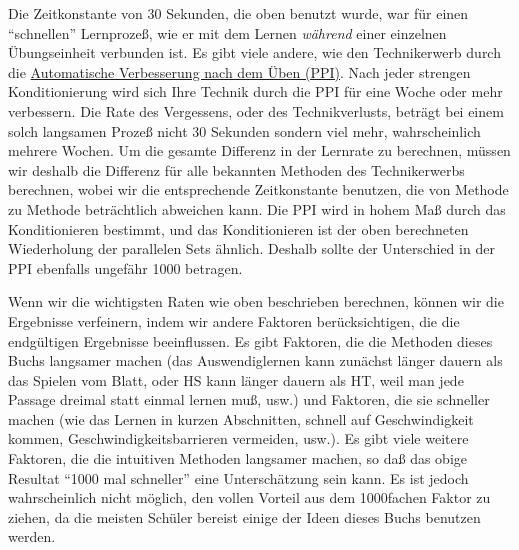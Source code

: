Die Zeitkonstante von 30 Sekunden, die oben benutzt wurde, war für einen \enquote{schnellen} Lernprozeß, wie er mit dem Lernen \textit{während} einer einzelnen Übungseinheit verbunden ist.
Es gibt viele andere, wie den Technikerwerb durch die \hyperref[c1ii15]{Automatische Verbesserung nach dem Üben (PPI)}.
Nach jeder strengen Konditionierung wird sich Ihre Technik durch die PPI für eine Woche oder mehr verbessern.
Die Rate des Vergessens, oder des Technikverlusts, beträgt bei einem solch langsamen Prozeß nicht 30 Sekunden sondern viel mehr, wahrscheinlich mehrere Wochen.
Um die gesamte Differenz in der Lernrate zu berechnen, müssen wir deshalb die Differenz für alle bekannten Methoden des Technikerwerbs berechnen, wobei wir die entsprechende Zeitkonstante benutzen, die von Methode zu Methode beträchtlich abweichen kann.
Die PPI wird in hohem Maß durch das Konditionieren bestimmt, und das Konditionieren ist der oben berechneten Wiederholung der parallelen Sets ähnlich.
Deshalb sollte der Unterschied in der PPI ebenfalls ungefähr 1000 betragen.

Wenn wir die wichtigsten Raten wie oben beschrieben berechnen, können wir die Ergebnisse verfeinern, indem wir andere Faktoren berücksichtigen, die die endgültigen Ergebnisse beeinflussen.
Es gibt Faktoren, die die Methoden dieses Buchs langsamer machen (das Auswendiglernen kann zunächst länger dauern als das Spielen vom Blatt, oder HS kann länger dauern als HT, weil man jede Passage dreimal statt einmal lernen muß, usw.) und Faktoren, die sie schneller machen (wie das Lernen in kurzen Abschnitten, schnell auf Geschwindigkeit kommen, Geschwindigkeitsbarrieren vermeiden, usw.).
Es gibt viele weitere Faktoren, die die intuitiven Methoden langsamer machen, so daß das obige Resultat \enquote{1000 mal schneller} eine Unterschätzung sein kann.
Es ist jedoch wahrscheinlich nicht möglich, den vollen Vorteil aus dem 1000fachen Faktor zu ziehen, da die meisten Schüler bereist einige der Ideen dieses Buchs benutzen werden.

